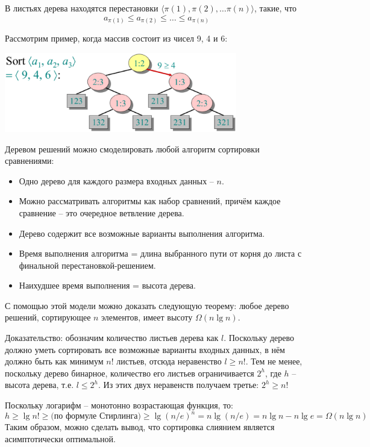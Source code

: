 \documentclass[a4paper,11pt]{article}
\begin{document}
В листьях дерева находятся перестановки $\langle \pi(1), \pi(2), \ldots \pi(n)
\rangle $, такие, что
\begin{equation*}
  a_{\pi(1)} \leqslant a_{\pi(2)} \leqslant \ldots \leqslant a_{\pi(n)}  
\end{equation*}

Рассмотрим пример, когда массив состоит из чисел 9, 4 и 6:

\includegraphics[width=4in]{lecture5/tree2.eps}

Деревом решений можно смоделировать любой алгоритм сортировки сравнениями:
\begin{itemize}
\item Одно дерево для каждого размера входных данных -- $n$.
\item Можно рассматривать алгоритмы как набор сравнений, причём каждое сравнение
  -- это очередное ветвление дерева.
\item Дерево содержит все возможные варианты выполнения алгоритма.
\item Время выполнения алгоритма = длина выбранного пути от корня до листа с
  финальной перестановкой-решением.
\item Наихудшее время выполнения = высота дерева.
\end{itemize}

С помощью этой модели можно доказать следующую теорему: любое дерево решений,
сортирующее $n$ элементов, имеет высоту $\Omega(n \lg n)$.

Доказательство: обозначим количество листьев дерева как $l$. Поскольку дерево
должно уметь сортировать все возможные варианты входных данных, в нём должно быть
как минимум $n!$ листьев, отсюда неравенство $l \geqslant n!$. Тем не менее,
поскольку дерево бинарное, количество его листьев ограничивается $2^h$, где $h$
-- высота дерева, т.е. $l \leqslant 2^h$. Из этих двух неравенств получаем
третье: $2^h \geqslant n!$

Поскольку логарифм -- монотонно возрастающая функция, то:
\begin{equation*}
  h \geqslant \lg n! \geqslant \text{(по формуле Стирлинга)} \geqslant \lg (n/e)^n
  = n \lg(n/e) = n\lg n - n \lg e = \Omega(n \lg n)
\end{equation*}
Таким образом, можно сделать вывод, что сортировка слиянием является
асимптотически оптимальной.
\end{document}

